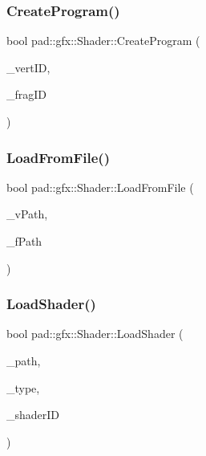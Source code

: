 \subsubsection{\texorpdfstring{Create\+Program()}{CreateProgram()}}
{\footnotesize\ttfamily bool pad\+::gfx\+::\+Shader\+::\+Create\+Program (\begin{DoxyParamCaption}\item[{const \mbox{\hyperlink{namespacepad_a7faacd72761782d8adef66f2feba3c21}{int32}}}]{\+\_\+vert\+ID,  }\item[{const \mbox{\hyperlink{namespacepad_a7faacd72761782d8adef66f2feba3c21}{int32}}}]{\+\_\+frag\+ID }\end{DoxyParamCaption})\hspace{0.3cm}{\ttfamily [private]}}

\mbox{\label{classpad_1_1gfx_1_1_shader_af1232aebd7859cd712cd5dbc08c05f32}} 
\subsubsection{\texorpdfstring{Load\+From\+File()}{LoadFromFile()}}
{\footnotesize\ttfamily bool pad\+::gfx\+::\+Shader\+::\+Load\+From\+File (\begin{DoxyParamCaption}\item[{const char $\ast$}]{\+\_\+v\+Path,  }\item[{const char $\ast$}]{\+\_\+f\+Path }\end{DoxyParamCaption})}

\mbox{\label{classpad_1_1gfx_1_1_shader_a4adbd190355e4920d4739130d651778a}} 
\subsubsection{\texorpdfstring{Load\+Shader()}{LoadShader()}}
{\footnotesize\ttfamily bool pad\+::gfx\+::\+Shader\+::\+Load\+Shader (\begin{DoxyParamCaption}\item[{const char $\ast$}]{\+\_\+path,  }\item[{const \mbox{\hyperlink{namespacepad_1_1gfx_a04785a7d8a9087a9f0f2459a99a068a6}{E\+\_\+\+S\+H\+A\+D\+E\+R\+\_\+\+T\+Y\+PE}} \&}]{\+\_\+type,  }\item[{\mbox{\hyperlink{namespacepad_a7faacd72761782d8adef66f2feba3c21}{int32}} \&}]{\+\_\+shader\+ID }\end{DoxyParamCaption})\hspace{0.3cm}{\ttfamily [private]}}

